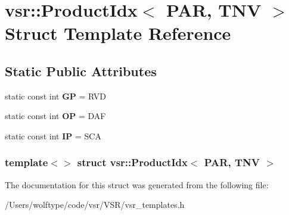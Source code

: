 \hypertarget{structvsr_1_1_product_idx_3_01_p_a_r_00_01_t_n_v_01_4}{\section{vsr\-:\-:Product\-Idx$<$ P\-A\-R, T\-N\-V $>$ Struct Template Reference}
\label{structvsr_1_1_product_idx_3_01_p_a_r_00_01_t_n_v_01_4}
}
\subsection*{Static Public Attributes}
\begin{DoxyCompactItemize}
\item 
\hypertarget{structvsr_1_1_product_idx_3_01_p_a_r_00_01_t_n_v_01_4_a616ab55fc833dc830cd0227bd46a1778}{static const int {\bfseries G\-P} = R\-V\-D}\label{structvsr_1_1_product_idx_3_01_p_a_r_00_01_t_n_v_01_4_a616ab55fc833dc830cd0227bd46a1778}

\item 
\hypertarget{structvsr_1_1_product_idx_3_01_p_a_r_00_01_t_n_v_01_4_ab3216ad4164e85ed80e1d625f6a851f4}{static const int {\bfseries O\-P} = D\-A\-F}\label{structvsr_1_1_product_idx_3_01_p_a_r_00_01_t_n_v_01_4_ab3216ad4164e85ed80e1d625f6a851f4}

\item 
\hypertarget{structvsr_1_1_product_idx_3_01_p_a_r_00_01_t_n_v_01_4_a5dfc1a5b359ab45f73ac200d941b66ac}{static const int {\bfseries I\-P} = S\-C\-A}\label{structvsr_1_1_product_idx_3_01_p_a_r_00_01_t_n_v_01_4_a5dfc1a5b359ab45f73ac200d941b66ac}

\end{DoxyCompactItemize}
\subsubsection*{template$<$$>$ struct vsr\-::\-Product\-Idx$<$ P\-A\-R, T\-N\-V $>$}



The documentation for this struct was generated from the following file\-:\begin{DoxyCompactItemize}
\item 
/\-Users/wolftype/code/vsr/\-V\-S\-R/vsr\-\_\-templates.\-h\end{DoxyCompactItemize}
